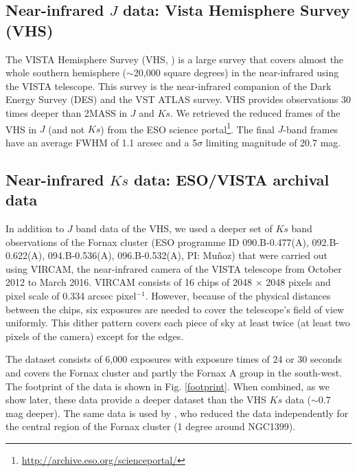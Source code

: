 \documentclass[fleqn,usenatbib]{mnras}
\begin{document}
\subsection{Near-infrared $J$ data: Vista Hemisphere Survey (VHS)}

The VISTA Hemisphere Survey (VHS, \citealp{vhs}) is a large survey that covers almost the whole southern hemisphere ($\sim$20,000 square degrees) in the near-infrared using the VISTA telescope. This survey is the near-infrared companion of the Dark Energy Survey (DES) and the VST ATLAS survey. VHS provides observations 30 times deeper than 2MASS in $J$ and $Ks$. We retrieved the reduced frames of the VHS in $J$ (and not $Ks$) from the ESO science portal\footnote{\url{http://archive.eso.org/scienceportal/}}. The final $J$-band frames have an average FWHM of 1.1 arcsec and a 5$\sigma$ limiting magnitude of 20.7 mag. 

\subsection{Near-infrared $Ks$ data: ESO/VISTA archival data}

In addition to $J$ band data of the VHS, we used a deeper set of $Ks$ band observations of the Fornax cluster (ESO programme ID 090.B-0.477(A), 092.B-0.622(A), 094.B-0.536(A), 096.B-0.532(A), PI: Mu\~noz) that were carried out using VIRCAM, the near-infrared camera of the VISTA telescope from October 2012 to March 2016. VIRCAM consists of 16 chips of 2048 $\times$ 2048 pixels and pixel scale of 0.334 arcsec pixel$^{-1}$. However, because of the physical distances between the chips, six exposures are needed to cover the telescope's field of view uniformly. This dither pattern covers each piece of sky at least twice (at least two pixels of the camera) except for the edges. 

The dataset consists of 6,000 exposures with exposure times of 24 or 30 seconds and covers the Fornax cluster and partly the Fornax A group in the south-west. The footprint of the data is shown in Fig. \ref{footprint}. When combined, as we show later, these data provide a deeper dataset than the VHS $Ks$ data ($\sim$0.7 mag deeper). The same data is used by \citet{yasna2018}, who reduced the data independently for the central region of the Fornax cluster (1 degree around NGC1399).
\end{document}
